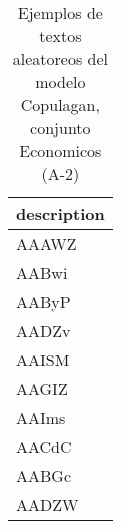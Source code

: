 \begin{table}[H]
\centering
\fontsize{8}{14}\selectfont
\caption{Ejemplos de textos aleatoreos del modelo Copulagan, conjunto Economicos (A-2)}
\label{table-sample10-economicos-a-2-copulagan-text}
\begin{tabular}{|m{50em}|}
\hline
\rowcolor[gray]{0.8}
description \\
\hline AAAWZ \\
\hline AABwi \\
\hline AAByP \\
\hline AADZv \\
\hline AAISM \\
\hline AAGIZ \\
\hline AAIms \\
\hline AACdC \\
\hline AABGc \\
\hline AADZW \\
\hline
\end{tabular}
\end{table}
